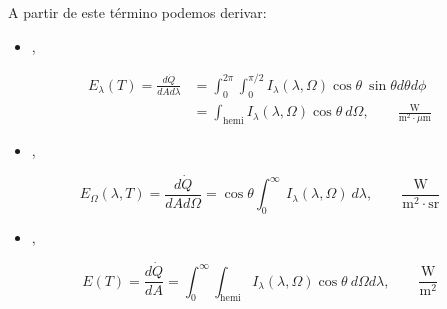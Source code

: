 \documentclass[letterpaper,10pt,english]{jupyterBook}
\begin{document}
\sphinxAtStartPar
A partir de este término podemos derivar:
\begin{itemize}
\item {} 
\sphinxAtStartPar
{},

\end{itemize}
\begin{align*}
E_{\lambda}(T) = \frac{d\dot{Q}}{dA d\lambda} &= \int_0^{2\pi}\int_0^{\pi/2}I_{\lambda}(\lambda,\Omega)\cos\theta~\sin\theta  d\theta d\phi
  \\ 
  &=\int_\mathrm{hemi} I_{\lambda}(\lambda,\Omega)\cos\theta~d\Omega
  ,\quad\quad\frac{\mathrm{W}}{\mathrm{m}^2\cdot\mu\mathrm{m}}
\end{align*}\begin{itemize}
\item {} 
\sphinxAtStartPar
{},

\end{itemize}
\begin{equation*}
E_\Omega(\lambda,T) = \frac{d\dot{Q}}{dAd\Omega}=\cos\theta \int_0^\infty~ I_{\lambda}(\lambda,\Omega)~d\lambda  ,\quad\quad\frac{\mathrm{W}}{\mathrm{m}^2 \cdot\mathrm{sr}}
\end{equation*}\begin{itemize}
\item {} 
\sphinxAtStartPar
{},

\end{itemize}
\begin{equation*}
E(T) = \frac{d\dot{Q}}{dA}=\int_0^\infty\int_\mathrm{hemi}I_{\lambda}(\lambda,\Omega)\cos\theta~d\Omega d\lambda ,\quad\quad\frac{\mathrm{W}}{\mathrm{m}^2}
\end{equation*}
\end{document}

